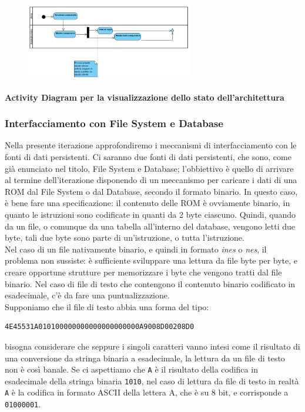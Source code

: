\documentclass[11pt]{article}
\begin{document}
\begin{figure}[h]
\centering
\includegraphics[width=275px, height = 133px]{AD_VisualizzaStatoArchitettura.png}
\end{figure}
\small\textbf{Activity Diagram per la visualizzazione dello stato dell'architettura}\\

\subsubsection{Interfacciamento con File System e Database}
Nella presente iterazione approfondiremo i meccanismi di interfacciamento con le fonti di dati persistenti. Ci saranno due fonti di dati persistenti, che sono, come già enunciato nel titolo, File System e Database; l'obbiettivo è quello di arrivare al termine dell'iterazione disponendo di un meccanismo per caricare i dati di una ROM dal File System o dal Database, secondo il formato binario. In questo caso, è bene fare una specificazione: il contenuto delle ROM è ovviamente binario, in quanto le istruzioni sono codificate in quanti da 2 byte ciascuno. Quindi, quando da un file, o comunque da una tabella all'interno del database, vengono letti due byte, tali due byte sono parte di un'istruzione, o tutta l'istruzione.\\
Nel caso di un file nativamente binario, e quindi in formato \emph{ines} o \emph{nes}, il problema non sussiste: è sufficiente sviluppare una lettura da file byte per byte, e creare opportune strutture per memorizzare i byte che vengono tratti dal file binario. Nel caso di file di testo che contengono il contenuto binario codificato in esadecimale, c'è da fare una puntualizzazione.\\
Supponiamo che il file di testo abbia una forma del tipo:
\begin{lstlisting}
4E45531A010100000000000000000000A9008D00208D0
\end{lstlisting}
bisogna considerare che seppure i singoli caratteri vanno intesi come il risultato di una conversione da stringa binaria a esadecimale, la lettura da un file di testo non è così banale. Se ci aspettiamo che \texttt{A} è il risultato della codifica in esadecimale della stringa binaria \texttt{1010}, nel caso di lettura da file di testo in realtà \texttt{A} è la codifica in formato ASCII della lettera A, che è su 8 bit, e corrisponde a \texttt{01000001}.\\
\end{document}
